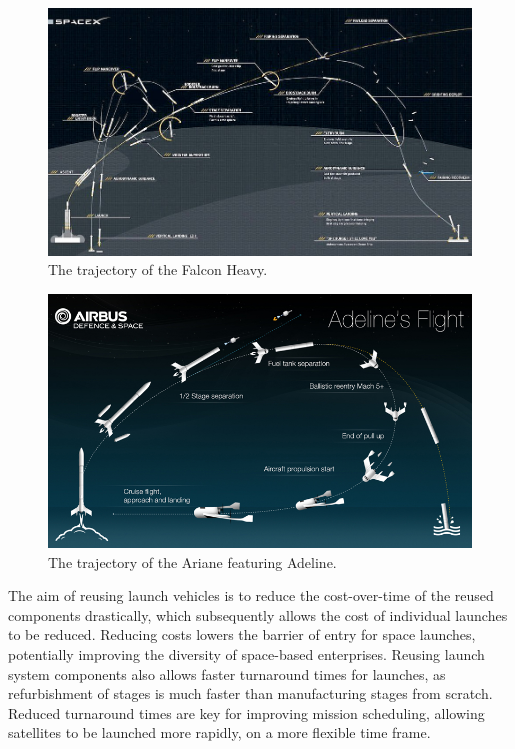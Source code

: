   \begin{figure}[ht]
  	\centering
  	\includegraphics[width=1\linewidth]{"figures/2_literature-review/FalconTrajectory"}
  	\caption{The trajectory of the Falcon Heavy\cite{FalconHeavy}.}
  	\label{fig:FalconTrajectory}
  \end{figure}
  
  
  
  \begin{figure}[ht]
  	\centering
  	\includegraphics[width=0.7\linewidth]{figures/2_literature-review/visuel_adeline1}
  	\caption{The trajectory of the Ariane featuring Adeline\cite{Adelineb}.}
  	\label{fig:visuel_adeline1}
  \end{figure}
  
       The aim of reusing launch vehicles is to reduce the cost-over-time of the reused components drastically, which subsequently allows the cost of individual launches to be reduced\cite{RichardWebb2016}. Reducing costs lowers the barrier of entry for space launches, potentially improving the diversity of space-based enterprises. 
       Reusing launch system components also allows faster turnaround times for launches, as refurbishment of stages is much faster than manufacturing stages from scratch. Reduced turnaround times are key for improving mission scheduling, allowing satellites to be launched more rapidly, on a more flexible time frame. 
  
